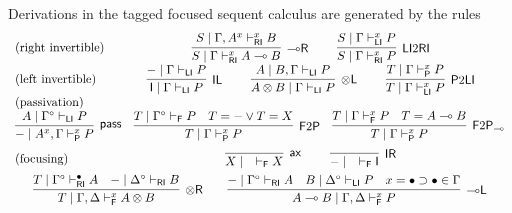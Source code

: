 \documentclass[submission,copyright,creativecommons]{eptcs}
\theoremstyle{definition}
\newtheorem{defn}{Definition}[section]
\newcommand{\tl}{\otimes \mathsf{L}}
\newcommand{\tr}{\otimes \mathsf{R}}
\newcommand{\lright}{{\multimap}\mathsf{R}}
\newcommand{\lleft}{{\multimap}\mathsf{L}}
\newcommand{\pass}{\mathsf{pass}}
\newcommand{\unitl}{\mathsf{IL}}
\newcommand{\unitr}{\mathsf{IR}}
\newcommand{\ax}{\mathsf{ax}}
\newcommand{\ot}{\otimes}
\newcommand{\lolli}{\multimap}
\newcommand{\I}{\mathsf{I}}
\newcommand{\RI}{\mathsf{RI}}
\newcommand{\LI}{\mathsf{LI}}
\newcommand{\Pass}{\mathsf{P}}
\newcommand{\F}{\mathsf{F}}
\newcommand{\xvdash}{\vdash^{x}}
\newcommand{\proofbox}[1]{\begin{tabular}{l} #1 \end{tabular}}
\newcommand{\NMILL}{\texttt{NMILL}}
\newcommand{\SkNMILL}{\NMILL\textsuperscript{\textit{s}}}
\newcommand{\FSkMCC}{\textsf{Free}}
\begin{document}
Derivations in the tagged focused sequent calculus are generated by the rules
\begin{equation}\label{eq:focus}
  \begin{array}{lc}
    \text{(right invertible)} & %
    \proofbox{
      \infer[\lright]{S \mid \Gamma \vdash^{x}_{\RI} A \lolli B}{S \mid \Gamma , A^{x} \vdash^{x}_{\RI} B}
    \qquad
    \infer[\LI 2 \RI]{S \mid \Gamma \vdash^{x}_{\RI} P}{S \mid \Gamma \vdash^{x}_{\LI} P}
    }
    \\[6pt]
    \text{(left invertible)} & %
    \proofbox{
      \infer[\unitl]{\I \mid \Gamma \vdash_{\LI} P}{- \mid \Gamma \vdash_{\LI} P}
    \qquad
    \infer[\tl]{A \ot B \mid \Gamma \vdash_{\LI} P}{A \mid B , \Gamma \vdash_{\LI} P}
    \qquad
    \infer[\Pass 2 \LI]{T \mid \Gamma \xvdash_{\LI} P}{T \mid \Gamma \xvdash_{\Pass} P}
    }
    \\
    \text{(passivation)} & \\ %
   \multicolumn{2}{c}{
    \infer[\pass]{- \mid A^{x} , \Gamma \xvdash_{\Pass} P }{
      A\mid \Gamma^{\circ} \vdash_{\LI} P
    }
    \quad
%    
    \infer[\F 2 \Pass]{T \mid \Gamma \xvdash_{\Pass} P}{
      T \mid \Gamma^\circ \vdash_{\F} P &
      T = - \vee T = X
    }
    \quad
    \infer[\F 2 \Pass_{{\lolli}}]{T \mid \Gamma \xvdash_{\Pass} P}{
      T \mid \Gamma \xvdash_{\F} P &
      T = A \lolli B
    }
    }
    \\[6pt]
    \text{(focusing)} &    %
    \proofbox{\infer[\ax]{X \mid \quad \vdash_{\F} X}{}
    \qquad
    \infer[\unitr]{- \mid \quad \vdash_{\F} \I}{}
    }
    \\[6pt]
    \multicolumn{2}{c}{
    \infer[\tr]{T \mid \Gamma , \Delta \xvdash_{\F} A \ot B}{
      T \mid \Gamma^{\circ} \vdash^{\bullet}_{\RI} A
      &
      - \mid \Delta^{\circ} \vdash_{\RI} B
    }
    \qquad
    \infer[\lleft]{A \lolli B \mid \Gamma , \Delta \xvdash_{\F} P}{
      - \mid \Gamma^{\circ} \vdash_{\RI} A
      &
      B \mid \Delta^{\circ} \vdash_{\LI} P
      &
      x = \bullet \supset \bullet \in \Gamma
    }
    }
  \end{array}
\end{equation}
\end{document}
